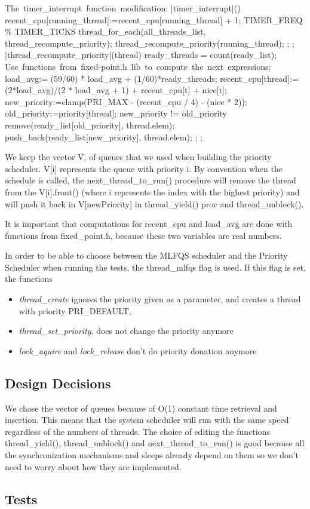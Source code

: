 	\begin{program}
	\mbox{The timer\_interrupt function modification:}     
	\PROC |timer\_interrupt|() \BODY
		recent\_cpu[running\_thread]:=recent\_cpu[running\_thread] + 1;
		\IF TIMER\_FREQ \% TIMER\_TICKS  
		      \THEN thread\_for\_each(all\_threads\_list, thread\_recompute\_priority); 
		      \ELSE thread\_recompute\_priority(running\_thread);
		\FI;
	\END;
	\PROC |thread\_recompute\_priority|(thread) \BODY
		ready\_threads = count(ready\_list);
		\mbox{Use functions from fixed-point.h lib to compute the next expressions};
		load\_avg:= (59/60) * load\_avg + (1/60)*ready_threads; 
		recent\_cpu[thread]:= (2*load\_avg)/(2 * load\_avg + 1) + recent\_cpu[t] + nice[t];
		new\_priority:=clamp(PRI\_MAX - (recent\_cpu / 4) - (nice * 2));
		old\_priority:=priority[thread];
		\IF new\_priority != old\_priority
		      \THEN remove(ready\_list[old\_priority], thread.elem);
			    push\_back(ready\_list[new\_priority], thread.elem);
		\FI;
	\END;
	\end{program}
	We keep the vector V, of queues that we used when building the priority scheduler. V[i] represents the queue with priority i. By convention when the schedule is called, the next\_thread\_to\_run() procedure will remove the thread from the V[i].front() (where i represents the index with the highest priority) and will push it back in V[newPriority] in thread\_yield() proc and thread\_unblock().


	It is important that computations for recent\_cpu and load\_avg are done with functions from fixed\_point.h, because these two variables are real numbers.

	In order to be able to choose between the MLFQS scheduler and the Priority Scheduler when running the tests, the thread\_mlfqs flag is used. If this flag is set, the functions 
	\begin{itemize}
	  \item \textit{thread\_create} ignores the priority given as a parameter, and creates a thread with priority PRI\_DEFAULT,
	  \item \textit{thread\_set\_priority}, does not change the priority anymore
	  \item \textit{lock\_aquire} and \textit{lock\_release} don't do priority donation anymore
	\end{itemize}

    \subsection{Design Decisions}
We chose the vector of queues because of O(1) constant time retrieval and insertion. This means that the system scheduler will run with the same speed regardless of the numbers of threads. The choice of editing the functions thread\_yield(), thread\_unblock() and next\_thread\_to\_run() is good because all the synchronization mechanisms and sleeps already depend on them so we don't need to worry about how they are implemented.



    \subsection{Tests}
